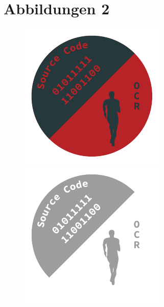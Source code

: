 \clearpage
\section*{Abbildungen 2}%
	\begin{figure}[!h]%
		\centering
		\begin{minipage}[b]{0.40\textwidth}
			\includegraphics[width=\textwidth]{images/Logo/Logo-negativ}%
		\end{minipage}
		\hfill
		\begin{minipage}[b]{0.30\textwidth}
			\includegraphics[width=\textwidth]{images/Logo/Logo-Grau}%

\end{minipage}
\end{figure}
